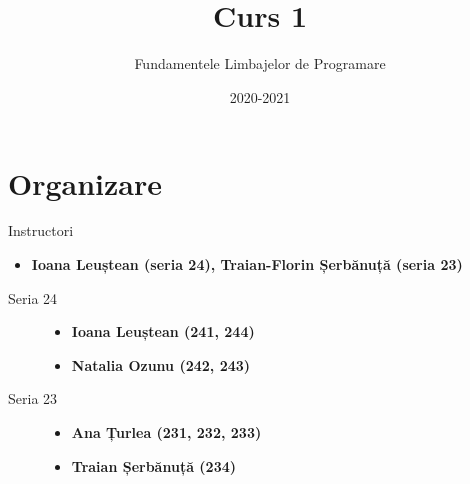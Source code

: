 \documentclass[xcolor=x11names,compress,10pt]{beamer}
\begin{document}
\title{\\Curs 1}
\author{Fundamentele Limbajelor de Programare} 
\date{2020-2021} 

\frame{\titlepage} 


\section{Organizare}  \sectionframe

\begin{frame}{Instructori}


\begin{itemize}
	 
	\item \textbf{{Ioana Leuștean (seria 24), Traian-Florin Șerbănuță (seria 23)}} 	
\end{itemize}

\bigskip
{}
\begin{description}
	\item[Seria 24] 
	\begin{itemize}
		\item \textbf{{Ioana Leuștean (241, 244)}}
		\medskip
		\item \textbf{{Natalia Ozunu (242, 243)}}
	\end{itemize}
	\item[Seria 23]
	\begin{itemize}
		\item  \textbf{Ana Țurlea (231, 232, 233)} 
		\medskip
		\item  \textbf{Traian Șerbănuță (234)} 
	\end{itemize} 
\end{description}

\end{frame}



\end{document}

